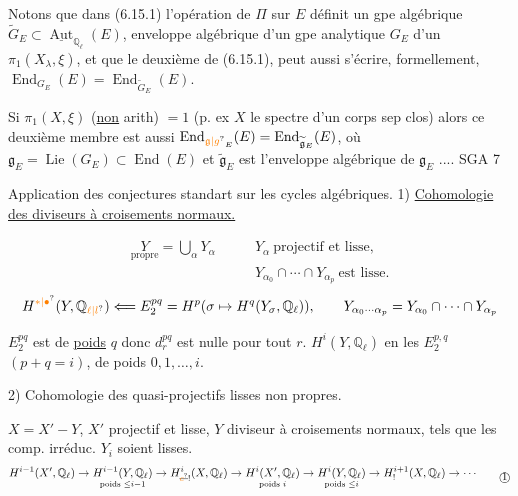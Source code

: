 Notons que  dans (6.15.1) l'opération de $\Pi$ sur $E$ définit un gpe algébrique $\widetilde G_E\subset\underline{\operatorname{Aut}}_{\mathbb{Q}_\ell}(E)$, enveloppe algébrique d'un gpe analytique $G_E$   d'un $\pi_1(X_\lambda,\xi)$, et que le deuxième  de (6.15.1), peut aussi s'écrire,  formellement, $\operatorname{End}_{G_E}(E)=\operatorname{End}_{\widetilde G_E}(E)$.

Si $\pi_1(X,\xi)$ (\uline{non} arith) $=1$ (p. ex $X$ le spectre d'un corps sep clos) alors ce deuxième membre est aussi $\operatorname{End}_{\unsure{\mathfrak g|g}_E}(E)=\operatorname{End}_{\widetilde{\mathfrak g}_E}(E)$, où $\mathfrak g_E=\operatorname{Lie}(G_E)\subset\operatorname{End}(E)$ et $\widetilde{\mathfrak g}_E$ est l'enveloppe algébrique de $\mathfrak g_E$ ....
SGA 7  

Application des conjectures standart sur les cycles algébriques.
1) \uline{Cohomologie des diviseurs à croisements normaux.}

\[
\begin{aligned}
\underset{\text{propre}}{Y}=\bigcup_\alpha Y_\alpha\qquad &Y_\alpha\ \text{projectif et lisse,}\\
&Y_{\alpha_0}\cap\cdots\cap Y_{\alpha_p}\ \text{est lisse.}
\end{aligned}
\]
\[
H^{\unsure{*|\bullet}}(Y,\mathbb{Q}_{\unsure{\ell|l}})\Longleftarrow E_2^{pq}=H^p(\sigma\mapsto H^q(Y_\sigma,\mathbb{Q}_\ell)),\qquad
Y_{\alpha_0\cdots\alpha_p}=Y_{\alpha_0}\cap\cdots\cap Y_{\alpha_p}
\]
 

$E_2^{pq}$ est de \uline{poids} $q$ donc $d_r^{pq}$ est nulle pour tout $r$.
$H^i(Y,\mathbb{Q}_\ell)$  en les $E_2^{p,q}$ $(p+q=i)$, de poids $0,1,\ldots,i$.

2) Cohomologie des   quasi-projectifs lisses non propres.

$X=X'-Y$, $X'$ projectif et lisse, $Y$ diviseur à croisements normaux, tels que les comp. irréduc. $Y_i$ soient lisses.
\[
\begin{aligned}
H^{i-1}(X',\mathbb{Q}_\ell)\to\underset{\text{poids }\leq i-1}{H^{i-1}(Y,\mathbb{Q}_\ell)}\to H^i_{\deleted{\unsure{c}}!}(X,\mathbb{Q}_\ell)\to\underset{\text{poids }i}{H^i(X',\mathbb{Q}_\ell)}\to\underset{\text{poids }\leq i}{H^i(Y,\mathbb{Q}_\ell)}\to H^{i+1}_!(X,\mathbb{Q}_\ell)\to\cdots
\end{aligned}
\tag*{\textcircled{1}}
\]

